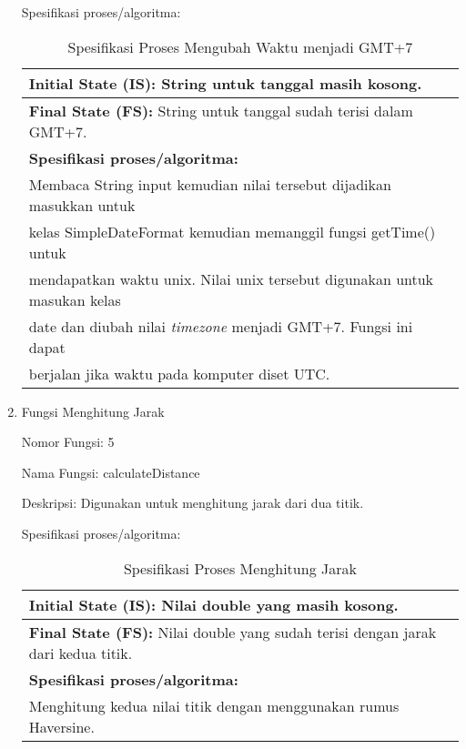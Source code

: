 \begin{enumerate}
	Spesifikasi proses/algoritma:
	\begin{table}[h]
	\caption{Spesifikasi Proses Mengubah Waktu menjadi GMT+7}
	\label{table:spesifikasiMengubahWaktuGMT7}
	\centering
	\begin{tabular}{|l|}
	\hline
	\textbf{Initial State (IS): }String untuk tanggal masih kosong.		 																			\\ \hline
	\textbf{Final State (FS): }String untuk tanggal sudah terisi dalam GMT+7.								 								\\ \hline
	\textbf{Spesifikasi proses/algoritma:}																 \\
	Membaca String input kemudian nilai tersebut dijadikan masukkan untuk     \\
	kelas SimpleDateFormat kemudian memanggil fungsi getTime() untuk 			    \\
	mendapatkan waktu unix. Nilai unix tersebut digunakan untuk masukan kelas \\
	date dan diubah nilai \textsl{timezone} menjadi GMT+7. Fungsi ini dapat   \\
	berjalan jika waktu pada komputer diset UTC. \\ \hline
	\end{tabular}
	\end{table}
	
	
	\item Fungsi Menghitung Jarak
	
	Nomor Fungsi: 5
	
	Nama Fungsi: calculateDistance
	
	Deskripsi: Digunakan untuk menghitung jarak dari dua titik.
	
	Spesifikasi proses/algoritma:
	\begin{table}[h]
	\caption{Spesifikasi Proses Menghitung Jarak}
	\label{table:spesifikasiMenghitungJarak}
	\centering
	\begin{tabular}{|l|}
	\hline
	\textbf{Initial State (IS): }Nilai double yang masih kosong.		 																			\\ \hline
	\textbf{Final State (FS): }Nilai double yang sudah terisi dengan jarak dari kedua titik.							\\ \hline
	\textbf{Spesifikasi proses/algoritma:}																 \\
	Menghitung kedua nilai titik dengan menggunakan rumus Haversine.\\ \hline
	\end{tabular}
	\end{table}
	

\end{enumerate}
